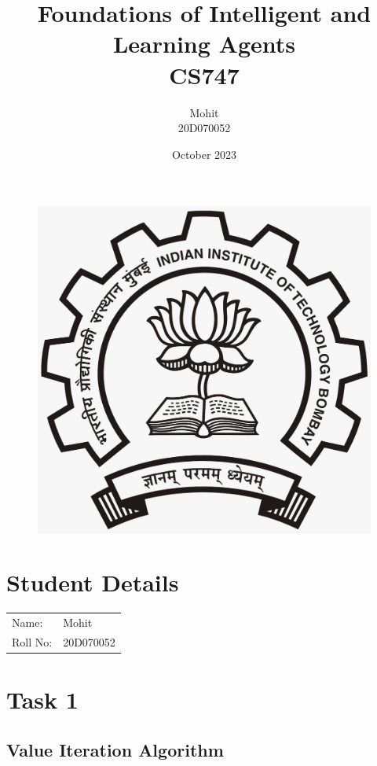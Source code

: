 \documentclass{article}
\title{Foundations of Intelligent and Learning Agents\\CS747}
\author{Mohit\\20D070052 }
\date{October 2023}
\begin{document}
\maketitle
\begin{figure}[H]
\begin{center}
\includegraphics[scale = 0.2]{LOGO.jpeg}
\end{center}
\end{figure}
\section{Student Details}
\begin{tabular}{ l l  }
 Name: & Mohit \\ 
 Roll No: & 20D070052  \\  
\end{tabular}

\newpage

\section{Task 1}


\subsection{Value Iteration Algorithm}
\end{document}
